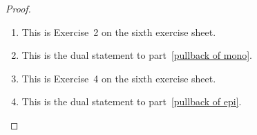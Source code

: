 \begin{proof}
  \leavevmode
  \begin{enumerate}
    \item
      This is Exercise~2 on the sixth exercise sheet.
    \item
      This is the dual statement to part~\ref*{pullback of mono}.
    \item
      This is Exercise~4 on the sixth exercise sheet.
    \item
      This is the dual statement to part~\ref*{pullback of epi}.
    \qedhere
  \end{enumerate}
\end{proof}

